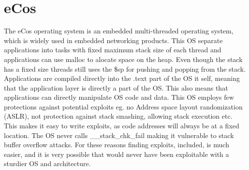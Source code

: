 \section{eCos}
\label{sec:eCos}
The eCos operating system is an embedded multi-threaded operating system, which is widely used in embedded networking products.
This OS separate applications into tasks with fixed maximum stack size of each thread and applications can use malloc to alocate space on the heap.
Even though the stack has a fixed size threads still uses the \$sp for pushing and popping from the stack.
Applications are compiled directly into the .text part of the OS it self, meaning that the application layer is directly a part of the OS.
This also means that applications can directly manipulate OS code and data.
This OS employs few protections against potential exploits eg. no Address space layout randomization (ASLR), not protection against stack smashing, allowing stack execution etc.
This makes it easy to write exploits, as code addresses will always be at a fixed location. The OS never calls \_\_stack\_chk\_fail making it vulnerable to stack buffer overflow attacks.
For these reasons finding exploits, \exploitname{} included, is much easier, and it is very possible that \exploitname{} would never have been exploitable with a sturdier OS and architecture.